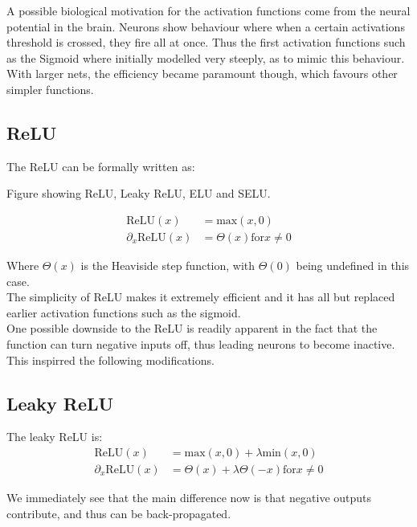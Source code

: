 A possible biological motivation for the activation functions come from the neural potential in the brain. Neurons show behaviour where when a certain activations threshold is crossed, they fire all at once. Thus the first activation functions such as the Sigmoid where initially modelled very steeply, as to mimic this behaviour. With larger nets, the efficiency became paramount though, which favours other simpler functions.

\subsection{ReLU} 
The ReLU can be formally written as:
\begin{marginfigure}
  \missingfigure{}%
\caption{Figure showing ReLU, Leaky ReLU, ELU and SELU.}
\end{marginfigure} 

\begin{align}
\text{ReLU}(x) &= \text{max}(x,0)\\
\partial_x \text{ReLU}(x) &= \Theta(x) \text{for} x \neq 0 
\end{align}

Where $\Theta(x)$ is the Heaviside step function, with $\Theta(0)$ being undefined in this case. \\

The simplicity of ReLU makes it extremely efficient and it has all but replaced earlier activation functions such as the sigmoid.\\

One possible downside to the ReLU is readily apparent in the fact that the function can turn negative inputs off, thus leading neurons to become inactive. This inspirred the following modifications.

\subsection{Leaky ReLU}
The leaky ReLU is:
\begin{align}
\text{ReLU}(x) &= \text{max}(x,0) + \lambda\text{min}(x,0)\\
\partial_x \text{ReLU}(x) &= \Theta(x) + \lambda \Theta(-x) \text{for} x \neq 0 
\end{align}


We immediately see that the main difference now is that negative outputs contribute, and thus can be back-propagated.\\

